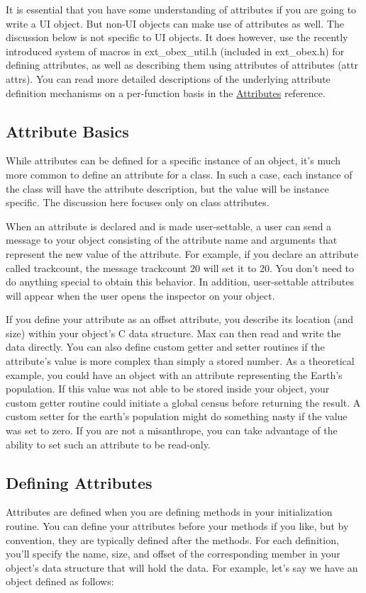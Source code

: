 It is essential that you have some understanding of attributes if you are going to write a UI object. But non-\/UI objects can make use of attributes as well. The discussion below is not specific to UI objects. It does however, use the recently introduced system of macros in ext\_\-obex\_\-util.h (included in ext\_\-obex.h) for defining attributes, as well as describing them using attributes of attributes (attr attrs). You can read more detailed descriptions of the underlying attribute definition mechanisms on a per-\/function basis in the \hyperlink{group__attr}{Attributes} reference.\hypertarget{chapter_msgattached_chapter_msgattached_attr_basics}{}\subsection{Attribute Basics}\label{chapter_msgattached_chapter_msgattached_attr_basics}
While attributes can be defined for a specific instance of an object, it's much more common to define an attribute for a class. In such a case, each instance of the class will have the attribute description, but the value will be instance specific. The discussion here focuses only on class attributes.

When an attribute is declared and is made user-\/settable, a user can send a message to your object consisting of the attribute name and arguments that represent the new value of the attribute. For example, if you declare an attribute called trackcount, the message trackcount 20 will set it to 20. You don't need to do anything special to obtain this behavior. In addition, user-\/settable attributes will appear when the user opens the inspector on your object.

If you define your attribute as an offset attribute, you describe its location (and size) within your object's C data structure. Max can then read and write the data directly. You can also define custom getter and setter routines if the attribute's value is more complex than simply a stored number. As a theoretical example, you could have an object with an attribute representing the Earth's population. If this value was not able to be stored inside your object, your custom getter routine could initiate a global census before returning the result. A custom setter for the earth's population might do something nasty if the value was set to zero. If you are not a misanthrope, you can take advantage of the ability to set such an attribute to be read-\/only.\hypertarget{chapter_msgattached_chapter_msgattached_attr_def}{}\subsection{Defining Attributes}\label{chapter_msgattached_chapter_msgattached_attr_def}
Attributes are defined when you are defining methods in your initialization routine. You can define your attributes before your methods if you like, but by convention, they are typically defined after the methods. For each definition, you'll specify the name, size, and offset of the corresponding member in your object's data structure that will hold the data. For example, let's say we have an object defined as follows:



